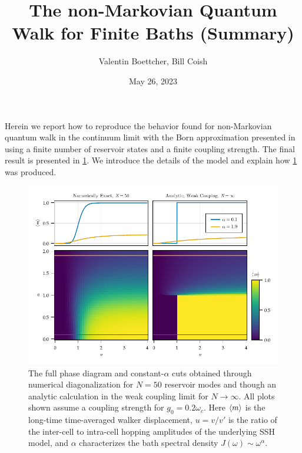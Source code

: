 \documentclass[fontsize=10pt,paper=b5,open=any,
twoside=no,toc=listof,toc=bibliography,headings=optiontohead,
captions=nooneline,captions=tableabove,english,DIV=15,numbers=noenddot,final,parskip=half-,
headinclude=true,footinclude=false,BCOR=0mm]{scrartcl}
\author{Valentin Boettcher, Bill Coish}
\title{The non-Markovian Quantum Walk for Finite Baths (Summary)}
\date{May 26, 2023}
\begin{document}
\maketitle
Herein we report how to reproduce the behavior found for non-Markovian
quantum walk in the continuum limit with the Born approximation
presented in  using a finite number of
reservoir states and a finite coupling strength. The final result is
presented in \cref{fig:example_finite_vs_continuum}. We introduce the
details of the model and explain how
\cref{fig:example_finite_vs_continuum} was produced.
\begin{figure}[H]
  \centering
  \includegraphics{plots/example_finite_vs_continuum}
  \caption{\label{fig:example_finite_vs_continuum} The full phase
    diagram and constant-\(α\) cuts obtained through numerical
    diagonalization for \(N=50\) reservoir modes and though an
    analytic calculation in the weak coupling limit for \(N\to
    ∞\). All plots shown assume a coupling strength for
    \(g_{0}=0.2 ω_{c}\). Here \(\ev{m}\) is the long-time
    time-averaged walker displacement, \(u=v/v\prime\) is the ratio of
    the inter-cell to intra-cell hopping amplitudes of the underlying
    SSH model, and \(α\) characterizes the bath spectral density
    \(J(ω)\sim ω^{α}\).}
\end{figure}
\end{document}
